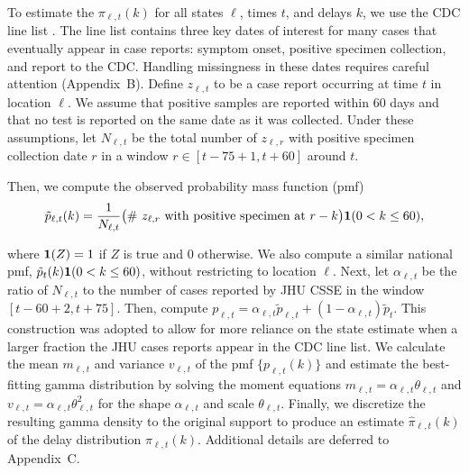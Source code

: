 
\begin{linenomath*} 
To estimate the $\pi_{\ell,t}(k)$ for all states $\ell$, times $t$, and delays
$k$, we use the CDC line list \citep{cdc2020caserestr}. The line list contains
three key dates of interest for many cases that eventually appear in case
reports: symptom onset, positive specimen collection, and report to the CDC.
Handling missingness in these dates requires careful attention
(Appendix~B). Define $z_{\ell,t}$ to be a case report occurring
at time $t$ in location $\ell$. We assume that positive samples
are reported within 60 days and that no test is reported on the same
date as it was collected. Under these assumptions, let $N_{\ell,t}$ be the total
number of $z_{\ell,r}$ with positive specimen collection date $r$ in a window $r
\in [t-75+1, t+60]$ around $t$. 
\end{linenomath*} 
\begin{linenomath*} 
Then, we compute the observed probability mass function (pmf)
\begin{align}
  \tilde{p}_{\ell,t}(k) = \frac{1}{N_{\ell,t}} \big(\textrm{\# $z_{\ell,r}$ with positive specimen at $r-k$}\big)\mathbf{1}(0<k\leq 60),
  \label{eq:line-list-delay}
\end{align}
\end{linenomath*} 
where $\mathbf{1}(Z) = 1$ if $Z$ is true and 0 otherwise. We also compute a
similar national pmf, $\tilde{p}_{t}(k)\mathbf{1}(0<k\leq 60)$, without
restricting to location $\ell$. Next, let $\alpha_{\ell,t}$ be the ratio of
$N_{\ell,t}$ to the number of cases reported by JHU
CSSE \citep{dong2020interactive} in the window $[t-60+2, t+75]$. Then, compute
$p_{\ell,t} = \alpha_{\ell,t}\tilde{p}_{\ell,t} +
(1-\alpha_{\ell,t})\tilde{p}_t$. This construction was adopted to allow for more
reliance on the state estimate when a larger fraction the JHU cases reports
appear in the CDC line list. We calculate the mean $m_{\ell,t}$
and variance $v_{\ell,t}$ of the pmf $\{p_{\ell,t}(k)\}$ and estimate the
best-fitting gamma distribution by solving the moment equations $m_{\ell,t} =
\alpha_{\ell,t}\theta_{\ell,t}$ and $v_{\ell,t}=
\alpha_{\ell,t}\theta_{\ell,t}^2$ for the shape $\alpha_{\ell,t}$ and scale
$\theta_{\ell,t}$. Finally, we discretize the resulting gamma density to the
original support to produce an estimate $\widehat{\pi}_{\ell,t}(k)$ of the delay
distribution $\pi_{\ell,t}(k)$. Additional details are deferred to 
Appendix~C.
 
